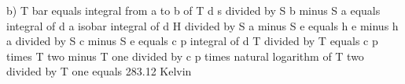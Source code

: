 b) T bar equals integral from a to b of T d s divided by S b minus S a equals integral of d a isobar integral of d H divided by S a minus S e equals h e minus h a divided by S c minus S e equals c p integral of d T divided by T equals c p times T two minus T one divided by c p times natural logarithm of T two divided by T one equals 283.12 Kelvin